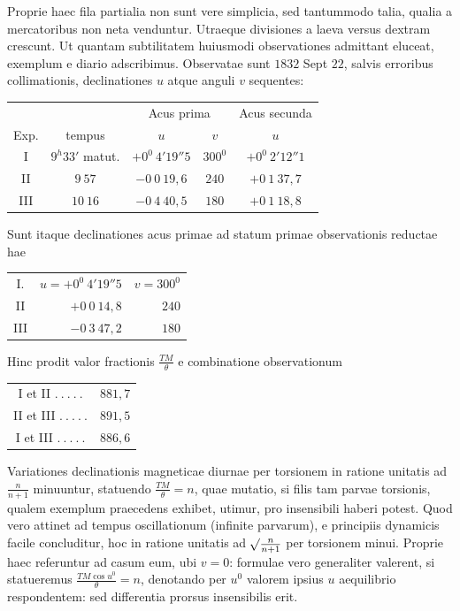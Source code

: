 \expandafter\def\csname HistoricalNoteText9\endcsname{Proprie haec fila partialia non sunt vere simplicia, sed tantummodo talia, qualia a mercatoribus non neta venduntur.}
\expandafter\def\csname HistoricalNoteText8\endcsname{Utraeque divisiones a laeva versus dextram crescunt.}
Ut quantam subtilitatem huiusmodi observationes admittant eluceat, exemplum e diario adscribimus. Observatae sunt $1832$ Sept $22$, salvis erroribus collimationis, declinationes $u$ atque anguli $v$ sequentes:
\begin{center}
\begin{tabular}{c|c||c|c||c}
&&\multicolumn{2}{c||}{Acus prima}&Acus secunda\\
Exp.&tempus&$u$&$v$&$u$\\\hline
I&$9^h33'$ matut.&$+0^0\ 4'19''5$&$300^0$&$+0^0\ 2'12''1$\\
II&$9\ 57$&$-0\ 0\ 19{,}6$&$240$&$+0\ 1\ 37{,}7$\\
III&$10\ 16$&$-0\ 4\ 40{,}5$&$180$&$+0\ 1\ 18{,}8$
\end{tabular}
\end{center}
Sunt itaque declinationes acus primae ad statum primae observationis reductae hae
\begin{center}
\begin{tabular}{crr}
I.&$u=+0^0\ 4'19''5$&$v=300^0$\\
II&$+0\ 0\ 14{,}8$&$240$\\
III&$-0\ 3\ 47{,}2$&$180$
\end{tabular}
\end{center}
Hinc prodit valor fractionis $\frac{TM}{\theta}$ e combinatione observationum
\begin{center}
\begin{tabular}{cr}
I et II $.\ .\ .\ .\ .$&$881{,}7$\\
II et III $.\ .\ .\ .\ .$&$891{,}5$\\
I et III $.\ .\ .\ .\ .$&$886{,}6$
\end{tabular}
\end{center}

Variationes declinationis magneticae diurnae per torsionem in ratione unitatis ad $\frac{n}{n+1}$ minuuntur, statuendo $\frac{TM}{\theta}=n$, quae mutatio, si filis tam parvae torsionis, qualem exemplum praecedens exhibet, utimur, pro insensibili haberi potest. Quod vero attinet ad tempus oscillationum (infinite parvarum), e principiis dynamicis facile concluditur, hoc in ratione unitatis ad $\mathord{{}^{}\!\surd}\frac{n}{n+1}$ per torsionem minui. Proprie haec referuntur ad casum eum, ubi $v=0$: formulae vero generaliter valerent, si statueremus $\frac{TM\cos u^0}{\theta}=n$, denotando per $u^0$ valorem ipsius $u$ aequilibrio respondentem: sed differentia prorsus insensibilis erit.

